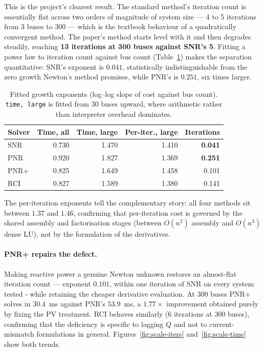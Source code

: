\documentclass[sigconf,nonacm]{acmart}
\begin{document}
This is the project's clearest result. The standard method's iteration count is
essentially flat across two orders of magnitude of system size --- 4 to 5
iterations from 3 buses to 300 --- which is the textbook behaviour of a
quadratically convergent method. The paper's method starts level with it and
then degrades steadily, reaching \textbf{13 iterations at 300 buses against
SNR's 5}. Fitting a power law to iteration count against bus count
(Table~\ref{tab:exponents}) makes the separation quantitative: SNR's exponent is
$0.041$, statistically indistinguishable from the zero growth Newton's method
promises, while PNR's is $0.251$, six times larger.

\begin{table}[t]
\centering
\caption{Fitted growth exponents (log--log slope of cost against bus count).
\texttt{time, large} is fitted from 30 buses upward, where arithmetic rather than
interpreter overhead dominates.}
\label{tab:exponents}
\small
\begin{tabular}{l r r r r}
\toprule
Solver & Time, all & Time, large & Per-iter., large & Iterations \\
\midrule
SNR  & 0.730 & 1.470 & 1.410 & \textbf{0.041} \\
PNR  & 0.920 & 1.827 & 1.369 & \textbf{0.251} \\
PNR+ & 0.825 & 1.649 & 1.458 & 0.101 \\
RCI  & 0.827 & 1.589 & 1.380 & 0.141 \\
\bottomrule
\end{tabular}
\end{table}

The per-iteration exponents tell the complementary story: all four methods sit
between $1.37$ and $1.46$, confirming that per-iteration cost is governed by the
shared assembly and factorisation stages (between $O(n^2)$ assembly and $O(n^3)$
dense LU), not by the formulation of the derivatives.

\paragraph{PNR+ repairs the defect.}
Making reactive power a genuine Newton unknown restores an almost-flat iteration
count --- exponent $0.101$, within one iteration of SNR on every system tested
- while retaining the cheaper derivative evaluation. At 300 buses PNR+ solves
in $30.4$~ms against PNR's $53.9$~ms, a $1.77\times$ improvement obtained purely
by fixing the PV treatment. RCI behaves similarly ($6$ iterations at 300 buses),
confirming that the deficiency is specific to lagging $Q$ and not to
current-mismatch formulations in general.
Figures~\ref{fig:scale-iters} and~\ref{fig:scale-time} show both trends.
\end{document}

